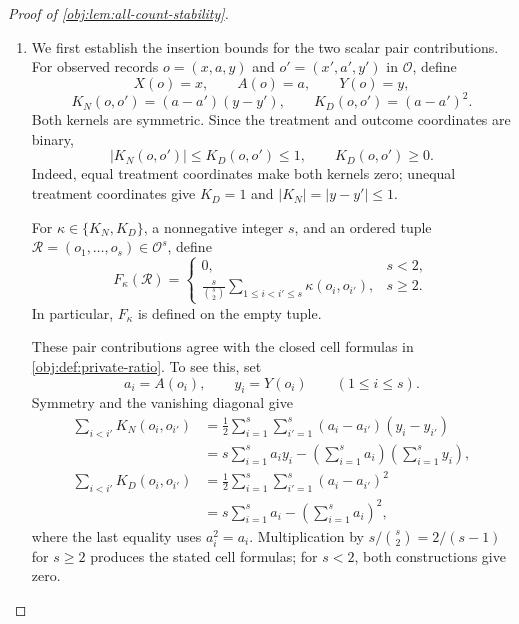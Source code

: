 \begin{proof}[Proof of \cref{obj:lem:all-count-stability}]
\begin{enumerate}
\item We first establish the insertion bounds for the two scalar pair contributions. For observed records \(o=(x,a,y)\) and \(o'=(x',a',y')\) in \(\mathcal O\), define
\[
X(o)=x,\qquad A(o)=a,\qquad Y(o)=y,
\]
\[
K_N(o,o')=(a-a')(y-y'),
\qquad
K_D(o,o')=(a-a')^2.
\]
Both kernels are symmetric. Since the treatment and outcome coordinates are binary,
\[
|K_N(o,o')|\le K_D(o,o')\le1,
\qquad
K_D(o,o')\ge0.
\]
Indeed, equal treatment coordinates make both kernels zero; unequal treatment coordinates give \(K_D=1\) and \(|K_N|=|y-y'|\le1\).

For \(\kappa\in\{K_N,K_D\}\), a nonnegative integer \(s\), and an ordered tuple \(\mathscr R=(o_1,\ldots,o_s)\in\mathcal O^s\), define
\[
F_\kappa(\mathscr R)=
\begin{cases}
0,&s<2,\\[2pt]
\displaystyle\frac{s}{\binom{s}{2}}
\sum_{1\le i<i'\le s}\kappa(o_i,o_{i'}),&s\ge2.
\end{cases}
\]
In particular, \(F_\kappa\) is defined on the empty tuple.

These pair contributions agree with the closed cell formulas in \cref{obj:def:private-ratio}. To see this, set
\[
a_i=A(o_i),\qquad y_i=Y(o_i)\qquad(1\le i\le s).
\]
Symmetry and the vanishing diagonal give
\[
\begin{aligned}
\sum_{i<i'}K_N(o_i,o_{i'})
&=\frac12\sum_{i=1}^s\sum_{i'=1}^s
(a_i-a_{i'})(y_i-y_{i'})\\
&=s\sum_{i=1}^s a_i y_i
-\left(\sum_{i=1}^s a_i\right)
 \left(\sum_{i=1}^s y_i\right),\\
\sum_{i<i'}K_D(o_i,o_{i'})
&=\frac12\sum_{i=1}^s\sum_{i'=1}^s(a_i-a_{i'})^2\\
&=s\sum_{i=1}^s a_i-\left(\sum_{i=1}^s a_i\right)^2,
\end{aligned}
\]
where the last equality uses \(a_i^2=a_i\). Multiplication by
\(s/\binom{s}{2}=2/(s-1)\) for \(s\ge2\) produces the stated cell formulas; for \(s<2\), both constructions give zero.


\end{enumerate}
\end{proof}
